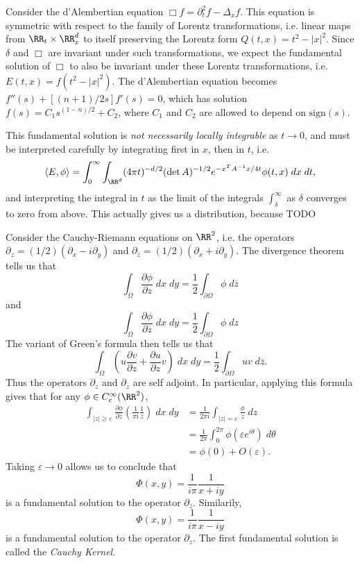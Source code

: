 \begin{example}
    Consider the d'Alembertian equation $\Box f = \partial_t^2 f - \Delta_x f$. This equation is symmetric with respect to the family of Lorentz transformations, i.e. linear maps from $\RR_t \times \RR^d_x$ to itself preserving the Lorentz form $Q(t,x) = t^2 - |x|^2$. Since $\delta$ and $\Box$ are invariant under such transformations, we expect the fundamental solution of $\Box$ to also be invariant under these Lorentz transformations, i.e. $E(t,x) = f(t^2 - |x|^2)$. The d'Alembertian equation becomes $f''(s) + [(n+1)/2s] f'(s) = 0$, which has solution $f(s) = C_1 s^{(1-n)/2} + C_2$, where $C_1$ and $C_2$ are allowed to depend on $\text{sign}(s)$.

    This fundamental solution is \emph{not necessarily locally integrable} as $t \to 0$, and must be interpreted carefully by integrating first in $x$, then in $t$, i.e.
    \[ \langle E, \phi \rangle = \int_0^\infty \int_{\RR^d} (4 \pi t)^{-d/2} (\det A)^{-1/2} e^{-x^T A^{-1} x / 4t} \phi(t,x) \; dx\; dt, \]
    and interpreting the integral in $t$ as the limit of the integrals $\int_\delta^\infty$ as $\delta$ converges to zero from above. This actually gives us a distribution, because TODO
\end{example}

\begin{example}
    Consider the Cauchy-Riemann equations on $\RR^2$, i.e. the operators $\partial_z = (1/2)(\partial_x - i \partial_y)$ and $\partial_{\overline{z}} = (1/2)(\partial_x + i \partial_y)$. The divergence theorem tells us that
    \[ \int_\Omega \frac{\partial \phi}{\partial z}\; dx\; dy = \frac{1}{2} \int_{\partial \Omega} \phi\; d\overline{z} \]
    and
    \[ \int_\Omega \frac{\partial \phi}{\partial \overline{z}}\; dx\; dy = \frac{1}{2} \int_{\partial \Omega} \phi\; dz \]
    The variant of Green's formula then tells us that
    \[ \int_\Omega \left( u \frac{\partial v}{\partial z} + \frac{\partial u}{\partial z} v \right)\; dx\; dy = \frac{1}{2} \int_{\partial \Omega} uv\; d\overline{z}. \]
    Thus the operators $\partial_z$ and $\partial_{\overline{z}}$ are self adjoint. In particular, applying this formula gives that for any $\phi \in C_c^\infty(\RR^2)$,
    \begin{align*}
        \int_{|z| \geq \varepsilon} \frac{\partial \phi}{\partial \overline{z}} \left( \frac{1}{\pi i} \frac{1}{z} \right)\; dx\; dy &= \frac{1}{2 \pi i} \int_{|z| = \varepsilon} \frac{\phi}{z}\; dz\\
        &= \frac{1}{2 \pi} \int_0^{2\pi} \phi(\varepsilon e^{i \theta})\; d\theta\\
        &= \phi(0) + O(\varepsilon).
    \end{align*}
    Taking $\varepsilon \to 0$ allows us to conclude that
    \[ \Phi(x,y) = \frac{1}{i \pi} \frac{1}{x + iy} \]
    is a fundamental solution to the operator $\partial_{\overline{z}}$. Similarily,
    \[ \Phi(x,y) = \frac{1}{i \pi} \frac{1}{x - iy} \]
    is a fundamental solution to the operator $\partial_z$. The first fundamental solution is called the \emph{Cauchy Kernel}.
\end{example}

